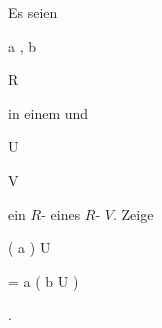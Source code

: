 {


Es seien


\mavergleichskette

{\vergleichskette

{ {\mathfrak a} , {\mathfrak b}
}

{ \subseteq }{ R
}

{  }{
}

{    }{
}

{   }{
}

}
{}{}{}
in einem
und


\mavergleichskette

{\vergleichskette

{U
}

{ \subseteq }{ V
}

{  }{
}

{    }{
}

{   }{
}

}
{}{}{}
ein
$R$-
eines
$R$-
$V$. Zeige


\mavergleichskettedisp

{\vergleichskette

{ \left(  {\mathfrak a}   \right)  \cdot U
}

{ =} { {\mathfrak a} \cdot \left(  {\mathfrak b} \cdot U  \right)
}

{ } {
}

{ } {
}

{ } {
}

}
{}{}{.}


}

{} {}



{}

